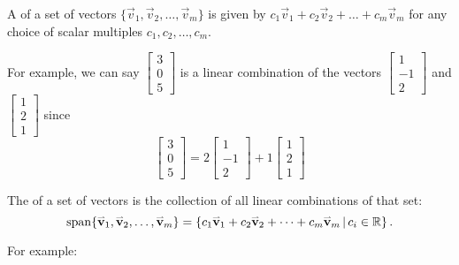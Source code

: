 \begin{applicationActivities}
\begin{definition}
  A  of a set of vectors
  \(\{\vec v_1,\vec v_2,\dots,\vec v_m\}\) is given by
  \(c_1\vec v_1+c_2\vec v_2+\dots+c_m\vec v_m\) for any choice of
  scalar multiples \(c_1,c_2,\dots,c_m\).

	\vspace{2em}

  For example, we can say \(\begin{bmatrix}3 \\0 \\ 5\end{bmatrix}\) 
  is a linear combination of the vectors \(\begin{bmatrix} 1 \\ -1 \\ 2 \end{bmatrix}\) 
  and \(\begin{bmatrix} 1 \\ 2 \\ 1 \end{bmatrix}\) since 
  \[
    \begin{bmatrix} 3 \\ 0 \\ 5 \end{bmatrix} = 
    2 \begin{bmatrix} 1 \\ -1 \\ 2 \end{bmatrix} + 
    1\begin{bmatrix} 1 \\ 2 \\ 1 \end{bmatrix}
  \]
\end{definition}

\begin{definition}
  The  of a set of vectors is the collection of all linear
  combinations of that set:
  \[
    \operatorname{span}\{\mathbf{\accentset{\rightharpoonup}{v}}_1,\mathbf{\accentset{\rightharpoonup}{v}}_2,\dots,\mathbf{\accentset{\rightharpoonup}{v}}_m\} =
    \left\{c_1\mathbf{\accentset{\rightharpoonup}{v}}_1+c_2\mathbf{\accentset{\rightharpoonup}{v}}_2+\dots+c_m\mathbf{\accentset{\rightharpoonup}{v}}_m\,\middle|\,
    c_i\in\mathbb{R}\right\}.
  \]

	\vspace{2em}

  For example:


\end{definition}
\end{applicationActivities}
